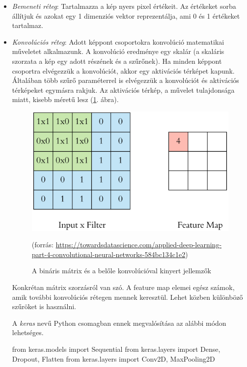 \begin{itemize}
\item \textit{Bemeneti réteg}: Tartalmazza a kép nyers pixel értékeit. Az értékeket sorba állítjuk és azokat egy 1 dimenziós vektor reprezentálja, ami 0 és 1 értékeket tartalmaz.

\item \textit{Konvolúciós réteg}: Adott képpont csoportokra konvolúció matematikai műveletet alkalmazunk. A konvolúció eredménye egy skalár (a skaláris szorzata a kép egy adott részének és a szűrőnek). Ha minden képpont csoportra elvégezzük a konvolúciót, akkor egy aktivációs térképet kapunk. Általában több szűrő paraméterrel is elvégezzük a konvolúciót és aktivációs térképeket egymásra rakjuk. Az aktivációs térkép, a művelet tulajdonsága miatt, kisebb
méretű lesz (\ref{fig:convolution}. ábra).

\begin{figure}[h]
\centering
\includegraphics[scale=0.3]{images/convolution}
\caption{A bináris mátrix és a belőle konvolúcióval kinyert jellemzők}
(forrás: \url{https://towardsdatascience.com/applied-deep-learning-part-4-convolutional-neural-networks-584bc134c1e2})
\label{fig:convolution}
\end{figure}

Konkrétan mátrix szorzásról van szó. A feature map elemei egész számok, amik további konvolúciós rétegen mennek keresztül. Lehet közben különböző szűröket is használni.

A \textit{keras} nevű Python csomagban ennek megvalósítása az alábbi módon lehetséges.
\begin{python}
from keras.models import Sequential
from keras.layers import Dense, Dropout, Flatten
from keras.layers import Conv2D, MaxPooling2D


\end{python}
\end{itemize}
